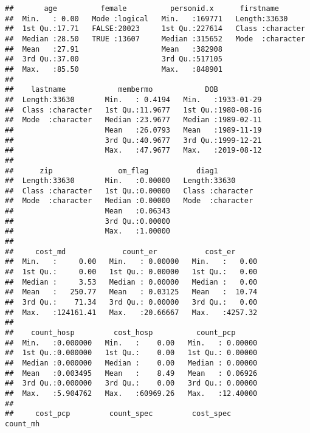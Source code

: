 \documentclass[]{article}
\begin{document}
\begin{verbatim}
##       age          female          personid.x      firstname        
##  Min.   : 0.00   Mode :logical   Min.   :169771   Length:33630      
##  1st Qu.:17.71   FALSE:20023     1st Qu.:227614   Class :character  
##  Median :28.50   TRUE :13607     Median :315652   Mode  :character  
##  Mean   :27.91                   Mean   :382908                     
##  3rd Qu.:37.00                   3rd Qu.:517105                     
##  Max.   :85.50                   Max.   :848901                     
##                                                                     
##    lastname            membermo            DOB            
##  Length:33630       Min.   : 0.4194   Min.   :1933-01-29  
##  Class :character   1st Qu.:11.9677   1st Qu.:1980-08-16  
##  Mode  :character   Median :23.9677   Median :1989-02-11  
##                     Mean   :26.0793   Mean   :1989-11-19  
##                     3rd Qu.:40.9677   3rd Qu.:1999-12-21  
##                     Max.   :47.9677   Max.   :2019-08-12  
##                                                           
##      zip               om_flag           diag1          
##  Length:33630       Min.   :0.00000   Length:33630      
##  Class :character   1st Qu.:0.00000   Class :character  
##  Mode  :character   Median :0.00000   Mode  :character  
##                     Mean   :0.06343                     
##                     3rd Qu.:0.00000                     
##                     Max.   :1.00000                     
##                                                         
##     cost_md             count_er           cost_er       
##  Min.   :     0.00   Min.   : 0.00000   Min.   :   0.00  
##  1st Qu.:     0.00   1st Qu.: 0.00000   1st Qu.:   0.00  
##  Median :     3.53   Median : 0.00000   Median :   0.00  
##  Mean   :   250.77   Mean   : 0.03125   Mean   :  10.74  
##  3rd Qu.:    71.34   3rd Qu.: 0.00000   3rd Qu.:   0.00  
##  Max.   :124161.41   Max.   :20.66667   Max.   :4257.32  
##                                                          
##    count_hosp         cost_hosp          count_pcp       
##  Min.   :0.000000   Min.   :    0.00   Min.   : 0.00000  
##  1st Qu.:0.000000   1st Qu.:    0.00   1st Qu.: 0.00000  
##  Median :0.000000   Median :    0.00   Median : 0.00000  
##  Mean   :0.003495   Mean   :    8.49   Mean   : 0.06926  
##  3rd Qu.:0.000000   3rd Qu.:    0.00   3rd Qu.: 0.00000  
##  Max.   :5.904762   Max.   :60969.26   Max.   :12.40000  
##                                                          
##     cost_pcp         count_spec         cost_spec           count_mh      

\end{verbatim}
\end{document}
